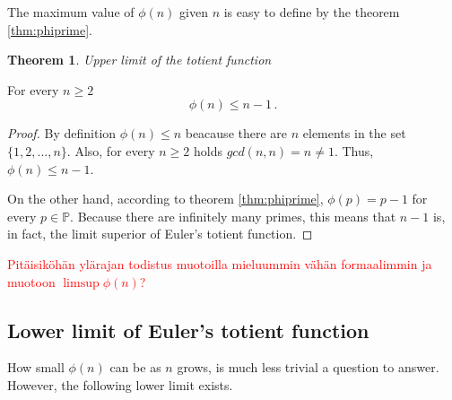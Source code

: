 \documentclass{article}
\theoremstyle{definition}
\newtheorem{theorem}[subsubsection]{Theorem}
\begin{document}
The maximum value of $\phi(n)$ given $n$ is easy to define by the theorem \ref{thm:phiprime}.

\begin{theorem}{\emph{Upper limit of the totient function}}

For every $n \geq 2$
\begin{equation*}
    \phi(n) \leq n-1\,.
\end{equation*}

\begin{proof}

By definition $\phi(n) \leq n$ beacause there are $n$ elements in the set $\{1,2,...,n\}$. Also, for every $n \geq 2$ holds $gcd(n,n) = n \neq 1$. Thus, $\phi(n) \leq n-1$.

On the other hand, according to theorem \ref{thm:phiprime}, $\phi(p) = p-1$ for every $p\in\mathbb{P}$. Because there are infinitely many primes, this means that $n-1$ is, in fact, the limit superior of Euler's totient function.

\end{proof}

\end{theorem}

\textcolor{red}{Pitäisiköhän ylärajan todistus muotoilla mieluummin vähän formaalimmin ja muotoon $\limsup{\phi(n)}$?}

\subsection{Lower limit of Euler's totient function}

How small $\phi(n)$ can be as $n$ grows, is much less trivial a question to answer. However, the following lower limit exists.
\end{document}
